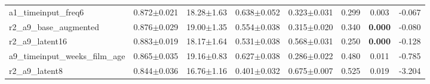 \begin{tabular}{lccccccc}
a1\_timeinput\_freq6 & 0.872$\pm$0.021 & 18.28$\pm$1.63 & 0.638$\pm$0.052 & 0.323$\pm$0.031 & 0.299 & 0.003 & -0.067 \\
r2\_a9\_base\_augmented & 0.876$\pm$0.029 & 19.00$\pm$1.35 & 0.554$\pm$0.038 & 0.315$\pm$0.020 & 0.340 & \textbf{0.000} & -0.080 \\
r2\_a9\_latent16 & 0.883$\pm$0.019 & 18.17$\pm$1.64 & 0.531$\pm$0.038 & 0.568$\pm$0.031 & 0.250 & \textbf{0.000} & -0.128 \\
a9\_timeinput\_weeks\_film\_age & 0.865$\pm$0.035 & 19.16$\pm$0.83 & 0.627$\pm$0.038 & 0.286$\pm$0.022 & 0.480 & 0.011 & -0.785 \\
r2\_a9\_latent8 & 0.844$\pm$0.036 & 16.76$\pm$1.16 & 0.401$\pm$0.032 & 0.675$\pm$0.007 & 0.525 & 0.019 & -3.204 \\
\bottomrule
\end{tabular}
